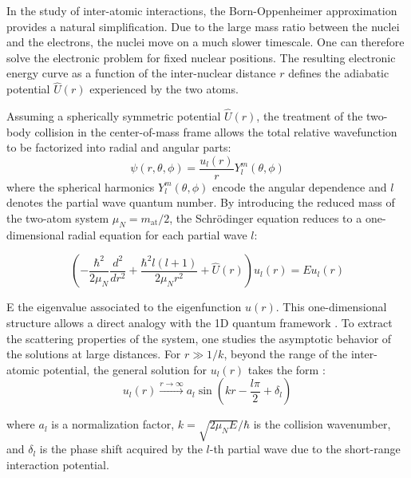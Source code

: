 In the study of inter-atomic interactions, the Born-Oppenheimer approximation provides a natural simplification. Due to the large mass ratio between the nuclei and the electrons,
 the nuclei move on a much slower timescale. One can therefore solve the electronic problem for fixed nuclear positions. The resulting electronic energy curve as a function of 
 the inter-nuclear distance $r$ defines the adiabatic potential $\hat{U}(r)$ experienced by the two atoms. 

Assuming a spherically symmetric potential $\hat{U}(r)$, the treatment of the two-body collision in the center-of-mass frame allows the total relative wavefunction to be 
factorized into radial and angular parts:
\begin{equation}
    \psi(r, \theta,\phi) = \frac{u_l(r)}{r} Y^m_l(\theta, \phi)
\end{equation}
where the spherical harmonics $Y^m_l(\theta, \phi)$ encode the angular dependence and $l$ denotes the partial wave quantum number. By introducing the reduced mass of the 
two-atom system $\mu_N = m_{\text{at}}/2$, 
the Schrödinger equation reduces to a one-dimensional radial equation for each partial wave $l$:

\begin{equation}
    \left( -\frac{\hbar^2}{2\mu_N} \frac{d^2}{dr^2} + \frac{\hbar^2 l(l+1)}{2\mu_N r^2} + \hat{U}(r) \right) u_l(r) = E u_l(r)
    \label{radial equation}
\end{equation}

E the eigenvalue associated to the eigenfunction $u(r)$.
This one-dimensional structure allows a direct analogy with the 1D quantum framework \cite{Landau}. To extract the scattering properties of the system, one studies the 
asymptotic behavior of the solutions at large 
distances. For $r\gg 1/k$, beyond the range of the inter-atomic potential, the general solution for $u_l(r)$ takes the form \cite{dalibard_interactions_nodate}:
\begin{equation}
    u_l(r) \xrightarrow{r\to\infty} a_l \sin\left(kr - \frac{l\pi}{2} + \delta_l\right)
    \label{solution at long r}
\end{equation}

where $a_l$ is a normalization factor, $k = \sqrt{2\mu_N E}/\hbar$ is the collision wavenumber, and $\delta_l$ is the phase shift acquired by the $l$-th partial wave due to the short-range interaction potential.

